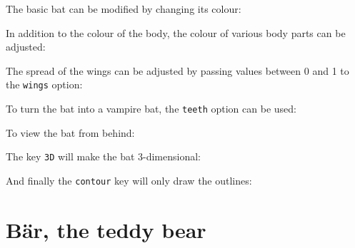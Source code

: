 \documentclass[parskip=half]{scrartcl}
\begin{document}
The basic bat can be modified by changing its colour:
\begin{tcblisting}{}
\bat[body=blue]
\end{tcblisting}

In addition to the colour of the body, the colour of various body parts can be adjusted:
\begin{tcblisting}{}
\bat[eye=red]
\end{tcblisting}
\begin{tcblisting}{}
\bat[pupil=red]
\end{tcblisting}
\begin{tcblisting}{}
\bat[mouth=red]
\end{tcblisting}
\begin{tcblisting}{}
\bat[ears=red]
\end{tcblisting}
\begin{tcblisting}{}
\bat[feet=red]
\end{tcblisting}

The spread of the wings can be adjusted by passing values between 0 and 1 to the \lstinline|wings| option:
\begin{tcblisting}{}
\bat[wings=0.5]
\end{tcblisting}

To turn the bat into a vampire bat, the \lstinline|teeth| option can be used:
\begin{tcblisting}{}
\bat[teeth=white]
\end{tcblisting}

To view the bat from behind:
\begin{tcblisting}{}
\bat[back]
\end{tcblisting}

The key \lstinline|3D| will make the bat 3-dimensional:
\begin{tcblisting}{}
\bat[3D]
\end{tcblisting}

And finally the \lstinline|contour| key will only draw the outlines:
\begin{tcblisting}{}
\bat[contour=black]
\end{tcblisting}

%
%
\clearpage
\section[Bear]{B\"ar, the teddy bear}
\end{document}
